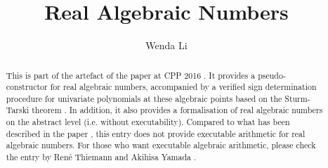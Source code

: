 \documentclass[11pt,a4paper]{article}
\begin{document}
\title{Real Algebraic Numbers}
\author{Wenda Li}
\maketitle

\begin{abstract}
  This is part of the artefact of the paper at CPP 2016 \cite{Li_CPP_16}. It provides a pseudo-constructor for real algebraic numbers, accompanied by a verified sign determination procedure for univariate polynomials at these algebraic points based on the Sturm-Tarski theorem \cite{Sturm_Tarski-AFP}. In addition, it also provides a formalisation of real algebraic numbers on the abstract level (i.e. without executability). Compared to what has been described in the paper \cite{Li_CPP_16}, this entry does not provide executable arithmetic for real algebraic numbers. For those who want executable algebraic arithmetic, please check the entry by René Thiemann and Akihisa Yamada \cite{Algebraic_Numbers-AFP}.
\end{abstract}






\end{document}
